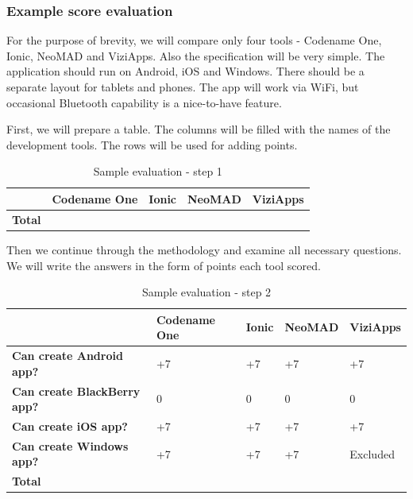 \documentclass[english,master,public,dept460,male,cpdeclaration,oneside]{diploma}
\begin{document}
\subsubsection{Example score evaluation}
For the purpose of brevity, we will compare only four tools - Codename One, Ionic, NeoMAD and ViziApps. Also the specification will be very simple. The application should run on Android, iOS and Windows. There should be a separate layout for tablets and phones. The app will work via WiFi, but occasional Bluetooth capability is a nice-to-have feature.

First, we will prepare a table. The columns will be filled with the names of the development tools. The rows will be used for adding points.

\begin{table}[!h]
	\centering
	\caption{Sample evaluation - step 1}
	\label{table:sampleEvaluation1}
	\begin{tabular}{p{2.5cm} | p{2.5cm} | p{2.5cm} | p{2.5cm} | p{2.5cm}}
		\toprule
		& \textbf{Codename One} & \textbf{Ionic} & \textbf{NeoMAD} & \textbf{ViziApps} \\
		\midrule
		\textbf{Total} &&&& \\
		\midrule
	\end{tabular}
\end{table}
	
Then we continue through the methodology and examine all necessary questions. We will write the answers in the form of points each tool scored.

\begin{table}[!h]
	\centering
	\caption{Sample evaluation - step 2}
	\label{table:sampleEvaluation2}
	\begin{tabular}{p{2.5cm} | p{2.5cm} | p{2.5cm} | p{2.5cm} | p{2.5cm}}
		\toprule
		& \textbf{Codename One} & \textbf{Ionic} & \textbf{NeoMAD} & \textbf{ViziApps} \\
		\midrule
		\textbf{Can create Android app?} & +7 & +7 & +7 & +7 \\
		\textbf{Can create BlackBerry app?} & 0 & 0 & 0 & 0 \\
		\textbf{Can create iOS app?} & +7 & +7 & +7 & +7 \\
		\textbf{Can create Windows app?} & +7 & +7 & +7 & Excluded \\
		\midrule
		\textbf{Total} &&&& \\
		\midrule
	\end{tabular}
\end{table}
\end{document}
